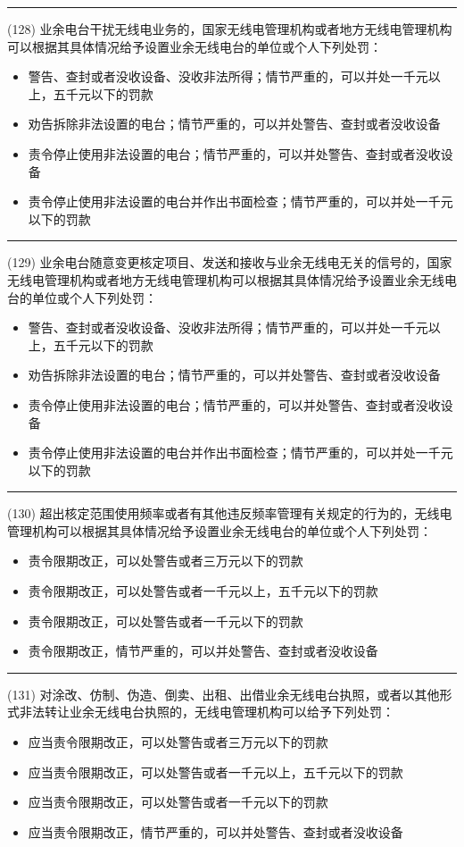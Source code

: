 \documentclass[twocolumn]{ctexart}  %
\begin{document}
\noindent\rule{0.5\textwidth}{1pt}
\heiti (128) 业余电台干扰无线电业务的，国家无线电管理机构或者地方无线电管理机构可以根据其具体情况给予设置业余无线电台的单位或个人下列处罚： \songti {\color{gray} [LK0095] }
\begin{itemize}
	\item  警告、查封或者没收设备、没收非法所得；情节严重的，可以并处一千元以上，五千元以下的罚款
	\item  劝告拆除非法设置的电台；情节严重的，可以并处警告、查封或者没收设备
	\item  责令停止使用非法设置的电台；情节严重的，可以并处警告、查封或者没收设备
	\item  责令停止使用非法设置的电台并作出书面检查；情节严重的，可以并处一千元以下的罚款
\end{itemize}


\noindent\rule{0.5\textwidth}{1pt}
\heiti (129) 业余电台随意变更核定项目、发送和接收与业余无线电无关的信号的，国家无线电管理机构或者地方无线电管理机构可以根据其具体情况给予设置业余无线电台的单位或个人下列处罚： \songti {\color{gray} [LK0096] }
\begin{itemize}
	\item  警告、查封或者没收设备、没收非法所得；情节严重的，可以并处一千元以上，五千元以下的罚款
	\item  劝告拆除非法设置的电台；情节严重的，可以并处警告、查封或者没收设备
	\item  责令停止使用非法设置的电台；情节严重的，可以并处警告、查封或者没收设备
	\item  责令停止使用非法设置的电台并作出书面检查；情节严重的，可以并处一千元以下的罚款
\end{itemize}


\noindent\rule{0.5\textwidth}{1pt}
\heiti (130) 超出核定范围使用频率或者有其他违反频率管理有关规定的行为的，无线电管理机构可以根据其具体情况给予设置业余无线电台的单位或个人下列处罚： \songti {\color{gray} [LK0097] }
\begin{itemize}
	\item  责令限期改正，可以处警告或者三万元以下的罚款
	\item  责令限期改正，可以处警告或者一千元以上，五千元以下的罚款
	\item  责令限期改正，可以处警告或者一千元以下的罚款
	\item  责令限期改正，情节严重的，可以并处警告、查封或者没收设备
\end{itemize}


\noindent\rule{0.5\textwidth}{1pt}
\heiti (131) 对涂改、仿制、伪造、倒卖、出租、出借业余无线电台执照，或者以其他形式非法转让业余无线电台执照的，无线电管理机构可以给予下列处罚： \songti {\color{gray} [LK0098] }
\begin{itemize}
	\item  应当责令限期改正，可以处警告或者三万元以下的罚款
	\item  应当责令限期改正，可以处警告或者一千元以上，五千元以下的罚款
	\item  应当责令限期改正，可以处警告或者一千元以下的罚款
	\item  应当责令限期改正，情节严重的，可以并处警告、查封或者没收设备
\end{itemize}
\end{document}
